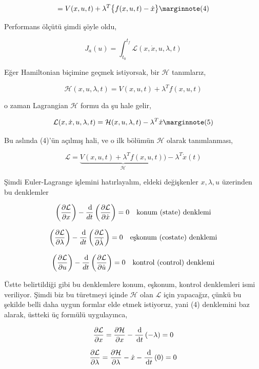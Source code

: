 \documentclass[12pt,fleqn]{article}\usepackage{../../common}
\begin{document}
$$
= V(x, u, t) +  \lambda^T \big\{ f(x, u, t) - \dot{x} \big\}
\mlabel{4}
$$


Performans ölçütü şimdi şöyle oldu,

$$
J_a(u) = \int_{t_0}^{t_f} \mathcal{L}( x, \dot{x}, u, \lambda, t)
$$

Eğer Hamiltonian biçimine geçmek istiyorsak, bir $\mathcal{H}$ tanımlarız,

$$
\mathcal{H}(x, u, \lambda, t) = V( x, u, t) + \lambda^T f(x, u, t)
$$

o zaman Lagrangian $\mathcal{H}$ formu da şu hale gelir,

$$
\mathcal{L}( x, \dot{x}, u, \lambda, t) = 
\mathcal{H}(x, u, \lambda, t) - \lambda^T \dot{x}
\mlabel{5}
$$

Bu aslında (4)'ün açılmış hali, ve o ilk bölümün $\mathcal{H}$ olarak tanımlanması,

$$ 
\mathcal{L} = \underbrace{V( x, u, t) + \lambda^T f( x, u, t))}_{\mathcal{H}} - 
\lambda^T \dot{x}(t) 
$$ 

Şimdi Euler-Lagrange işlemini hatırlayalım, eldeki değişkenler
$x,\lambda,u$ üzerinden bu denklemler

$$
\left( \frac{\partial \mathcal{L}}{\partial x} \right) -
\frac{\,\mathrm{d}}{dt} \left( \frac{\partial \mathcal{L}}{\partial \dot{x}} \right) 
= 0 
\quad
\textrm{konum (state) denklemi}
$$

$$
\left( \frac{\partial \mathcal{L}}{\partial \lambda} \right) -
\frac{\,\mathrm{d}}{dt} \left( \frac{\partial \mathcal{L}}{\partial \dot{\lambda}} \right) 
= 0
\quad
\textrm{eşkonum (costate) denklemi}
$$

$$
\left( \frac{\partial \mathcal{L}}{\partial u} \right) -
\frac{\,\mathrm{d}}{dt} \left( \frac{\partial \mathcal{L}}{\partial \dot{u}} \right) 
= 0
\quad
\textrm{kontrol (control) denklemi}
$$

Üstte belirtildiği gibi bu denklemlere konum, eşkonum, kontrol
denklemleri ismi veriliyor. Şimdi biz bu türetmeyi içinde
$\mathcal{H}$ olan $\mathcal{L}$ için yapacağız, çünkü bu şekilde
belli daha uygun formlar elde etmek istiyoruz, yani (4) denklemini baz
alarak, üstteki üç formülü uygulayınca,

$$
\frac{\partial \mathcal{L}}{\partial x} = 
\frac{\partial \mathcal{H}}{\partial x} - 
\frac{\,\mathrm{d}}{\,\mathrm{d} t} \left( -\lambda \right)   = 0
$$

$$
\frac{\partial \mathcal{L}}{\partial \lambda} = 
\frac{\partial \mathcal{H}}{\partial \lambda} - \dot{x} -
\frac{\,\mathrm{d}}{\,\mathrm{d} t} \left( 0 \right)   = 0
$$
\end{document}

